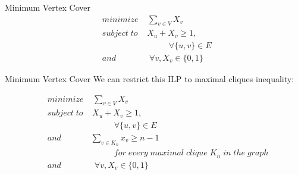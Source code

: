 \documentclass{beamer}
\begin{document}
\begin{frame}{Minimum Vertex Cover}
\pause
\begin{align*}
&minimize \; \;\; \; \sum_{v\in V}X_v \\
&subject\; to \;\;\; \; X_u + X_v  \geq 1 , \qquad \\
&\qquad 	\qquad\qquad\qquad	 \forall \{u,v\} \in E\\
&and	\qquad\qquad	 \forall v, X_v\in \{0,1\}
\end{align*}
\end{frame}


\begin{frame}{Minimum Vertex Cover}
We can restrict this ILP to maximal cliques inequality:

\pause
\begin{align*}
&minimize \; \;\; \; \sum_{v\in V}X_v\\
&subject\; to \;\;\; \; X_u + X_v  \geq 1 ,\\
&\qquad 	\qquad\qquad\qquad	 \forall \{u,v\} \in E\\
&and	\qquad\quad\;\; \sum_{v\in K_n}x_v \geq n - 1\\
& \qquad\qquad \qquad\qquad for\; every\; maximal\; clique\; K_n\; in\; the\; graph\\
&and	\qquad\qquad	 \forall v, X_v\in \{0,1\}
\end{align*}
\end{frame}
\end{document}

